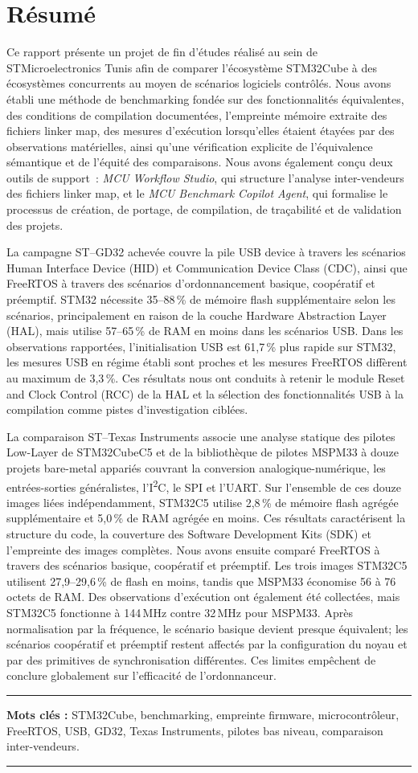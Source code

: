 \chapter*{Résumé}

Ce rapport présente un projet de fin d'études réalisé au sein de STMicroelectronics Tunis
afin de comparer l'écosystème STM32Cube à des écosystèmes concurrents au moyen de scénarios
logiciels contrôlés. Nous avons établi une méthode de benchmarking fondée sur des
fonctionnalités équivalentes, des conditions de compilation documentées, l'empreinte mémoire
extraite des fichiers linker map, des mesures d'exécution lorsqu'elles étaient étayées par
des observations matérielles, ainsi qu'une vérification explicite de l'équivalence sémantique
et de l'équité des comparaisons. Nous avons également conçu deux outils de support~:
\emph{MCU Workflow Studio}, qui structure l'analyse inter-vendeurs des fichiers linker map,
et le \emph{MCU Benchmark Copilot Agent}, qui formalise le processus de création, de portage,
de compilation, de traçabilité et de validation des projets.

La campagne ST--GD32 achevée couvre la pile USB device à travers les scénarios Human
Interface Device (HID) et Communication Device Class (CDC), ainsi que FreeRTOS à travers des
scénarios d'ordonnancement basique, coopératif et préemptif. STM32 nécessite 35--88\,\% de
mémoire flash supplémentaire selon les scénarios, principalement en raison de la couche
Hardware Abstraction Layer (HAL), mais utilise 57--65\,\% de RAM en moins dans les scénarios
USB. Dans les observations rapportées, l'initialisation USB est 61,7\,\% plus rapide sur
STM32, les mesures USB en régime établi sont proches et les mesures FreeRTOS diffèrent au
maximum de 3,3\,\%. Ces résultats nous ont conduits à retenir le module Reset and Clock
Control (RCC) de la HAL et la sélection des fonctionnalités USB à la compilation comme pistes
d'investigation ciblées.

La comparaison ST--Texas Instruments associe une analyse statique des pilotes Low-Layer de
STM32CubeC5 et de la bibliothèque de pilotes MSPM33 à douze projets bare-metal appariés
couvrant la conversion analogique-numérique, les entrées-sorties généralistes,
l'I\textsuperscript{2}C, le SPI et l'UART. Sur l'ensemble de ces douze images liées
indépendamment, STM32C5 utilise 2,8\,\% de mémoire flash agrégée supplémentaire et 5,0\,\% de
RAM agrégée en moins. Ces résultats caractérisent la structure du code, la couverture des
Software Development Kits (SDK) et l'empreinte des images complètes. Nous avons ensuite
comparé FreeRTOS à travers des scénarios basique, coopératif et préemptif. Les trois images
STM32C5 utilisent 27,9--29,6\,\% de flash en moins, tandis que MSPM33 économise 56 à 76
octets de RAM. Des observations d'exécution ont également été collectées, mais STM32C5
fonctionne à 144\,MHz contre 32\,MHz pour MSPM33. Après normalisation par la fréquence, le
scénario basique devient presque équivalent; les scénarios coopératif et préemptif restent
affectés par la configuration du noyau et par des primitives de synchronisation différentes.
Ces limites empêchent de conclure globalement sur l'efficacité de l'ordonnanceur.

\noindent\rule[2pt]{\textwidth}{0.5pt}

{\textbf{Mots clés :}}
STM32Cube, benchmarking, empreinte firmware, microcontrôleur, FreeRTOS, USB, GD32, Texas Instruments, pilotes bas niveau, comparaison inter-vendeurs.
\\
\noindent\rule[2pt]{\textwidth}{0.5pt}